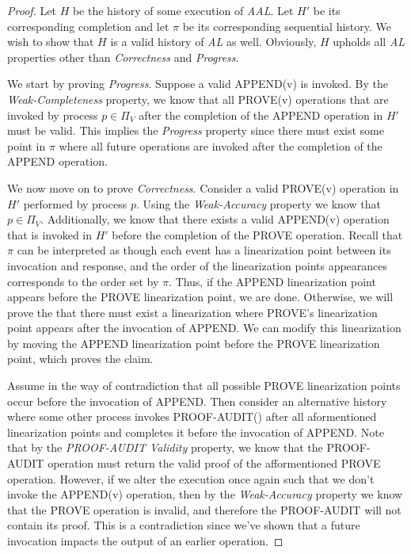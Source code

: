 \documentclass[11pt]{article}
\theoremstyle{definition}
\begin{document}
\begin{proof}\label{prf:AALEquivelancy}
Let $H$ be the history of some execution of \textit{AAL}. Let $H'$ be its corresponding completion and let $\pi$ be its corresponding sequential history. We wish to show that $H$ is a valid history of \textit{AL} as well. Obviously, $H$ upholds all \textit{AL} properties other than \textit{Correctness} and \textit{Progress}. 

We start by proving \textit{Progress}. Suppose a valid APPEND(v) is invoked. By the \textit{Weak-Completeness} property, we know that all PROVE(v) operations that are invoked by process $p \in \Pi_V $ after the completion of the APPEND operation in $H'$ must be valid. This implies the \textit{Progress} property since there must exist some point in $\pi$ where all future operations are invoked after the completion of the APPEND operation.

We now move on to prove \textit{Correctness}. Consider a valid PROVE(v) operation in $H'$ performed by process $p$. Using the \textit{Weak-Accuracy} property we know that $p \in \Pi_V$. Additionally, we know that there exists a valid \mbox{APPEND}(v) operation that is invoked in $H'$ 
 before the completion of the PROVE operation. Recall that $\pi$ can be interpreted as though each event has a linearization point between its invocation and response, and the order of the linearization points appearances corresponds to the order set by $\pi$. Thus, if the APPEND linearization point appears before the PROVE linearization point, we are done. Otherwise, we will prove the that there must exist a linearization where PROVE's linearization point appears after the invocation of APPEND. We can modify this linearization by moving the APPEND linearization point before the PROVE linearization point, which proves the claim.
 
Assume in the way of contradiction that all possible PROVE linearization points occur before the invocation of APPEND. Then consider an alternative history where some other process invokes PROOF-AUDIT() after all aformentioned linearization points and completes it before the invocation of APPEND. Note that by the \textit{PROOF-AUDIT Validity} property, we know that the PROOF-AUDIT operation must return the valid proof of the afformentioned PROVE operation. However, if we alter the execution once again such that we don't invoke the APPEND(v) operation, then by the \textit{Weak-Accuracy} property we know that the PROVE operation is invalid, and therefore the PROOF-AUDIT will not contain its proof. This is a contradiction since we've shown that a future invocation impacts the output of an earlier operation.

\end{proof}
\end{document}

